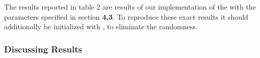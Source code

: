 The results reported in table 2 are results of our implementation of the  with the parameters specified in section \textbf{4.3}.
To reproduce these exact results it should additionally be initialized with , to eliminate the randomness.



\subsubsection{Discussing Results}







